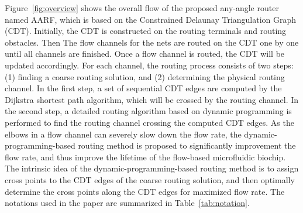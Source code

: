\documentclass[journal]{IEEEtran}
\begin{document}
Figure~\ref{fig:overview} shows the overall flow of the proposed any-angle router named AARF,
which is based on the Constrained Delaunay Triangulation Graph (CDT). 
Initially, the CDT is constructed on the routing terminals and routing obstacles. Then 
The flow channels for the nets are routed on the CDT one by one until all channels 
are finished. Once a flow channel is routed, the CDT will be updated accordingly. 
For each channel, the routing process consists of two steps: (1) finding a coarse routing solution, and (2) determining the physical routing channel. 
In the first step, a set of sequential CDT edges are computed by the
Dijkstra shortest path algorithm, which will be crossed by the routing channel. 
In the second step, a detailed routing algorithm based on dynamic programming is performed to find the routing channel crossing the computed CDT edges. 
As the elbows in a flow channel can severely slow down the flow rate, 
the dynamic-programming-based routing method is proposed to significantly improvement the flow rate, and thus improve the lifetime of the flow-based microfluidic biochip. 
The intrinsic idea of the dynamic-programming-based routing 
method is to assign cross points to the CDT edges of the coarse routing solution, and then optimally determine the cross points along the CDT
edges for maximized flow rate. The notations used in the paper are summarized in Table~\ref{tab:notation}.
\end{document}
